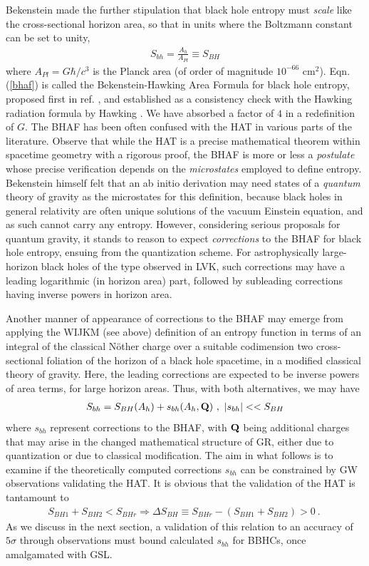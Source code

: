 \documentclass[11pt]{article}
\begin{document}
Bekenstein \cite{bek73} made the further stipulation that black hole entropy must {\it scale} like the cross-sectional horizon area, so that in units where the Boltzmann constant can be set to unity,  
\begin{eqnarray}
S_{bh} = \frac{A_h}{A_{Pl}} \equiv S_{BH} \label{bhaf} 
\end{eqnarray} 
where $A_{Pl} = G \hbar/c^3$ is the Planck area (of order of magnitude $10^{-66}$ cm$^2$). Eqn.(\ref{bhaf}) is called the Bekenstein-Hawking Area Formula for black hole entropy, proposed first in ref. \cite{bek73}, and established as a consistency check with the Hawking radiation formula by Hawking \cite{haw75}. We have absorbed a factor of $4$ in a redefinition of $G$. The BHAF has been often confused with the HAT in various parts of the literature. Observe that while the HAT is a precise mathematical theorem within spacetime geometry with a rigorous proof, the BHAF is more or less a {\it postulate} whose precise verification depends on the {\it microstates} employed to define entropy. Bekenstein himself felt \cite{bek73} that an ab initio derivation may need states of a {\it quantum} theory of gravity as the microstates for this definition, because black holes in general relativity are often unique solutions of the vacuum Einstein equation, and as such cannot carry any entropy. However, considering serious proposals for quantum gravity, it stands to reason to expect {\it corrections} to the BHAF for black hole entropy, ensuing from the quantization scheme. For astrophysically large-horizon black holes of the type observed in LVK, such corrections may have a leading logarithmic (in horizon area) part, followed by subleading corrections having inverse powers in horizon area. 

Another manner of appearance of corrections to the BHAF may emerge from applying the WIJKM (see above) definition of an entropy function in terms of an integral of the classical  N\"other charge over a suitable codimension two cross-sectional foliation of the horizon of a black hole spacetime, in a modified classical theory of gravity. Here, the leading corrections are expected to be inverse powers of area terms, for large horizon areas. Thus, with both alternatives, we may have
\begin{eqnarray}
S_{bh} = S_{BH}(A_h) + s_{bh}(A_h,{\bf Q})~,~|s_{bh}| << S_{BH} \label{cor}
\end{eqnarray}    
where $s_{bh}$ represent corrections to the BHAF, with ${\bf Q}$ being additional charges that may arise in the changed mathematical structure  of GR, either due to quantization or due to classical modification. The aim in what follows is to examine if the theoretically computed corrections $s_{bh}$ can be constrained by GW observations validating the HAT. It is obvious that the validation of the HAT is tantamount to 
\begin{eqnarray}
S_{BH1} + S_{BH2} < S_{BHr} \Rightarrow \Delta S_{BH} \equiv  S_{BHr}-(S_{BH1}+S_{BH2}) > 0~.~ \label{HATN}
\end{eqnarray}
As we discuss in the next section, a validation of this relation to an accuracy of $5\sigma$ through observations must bound calculated $s_{bh}$ for BBHCs, once amalgamated with GSL.  
\end{document}
